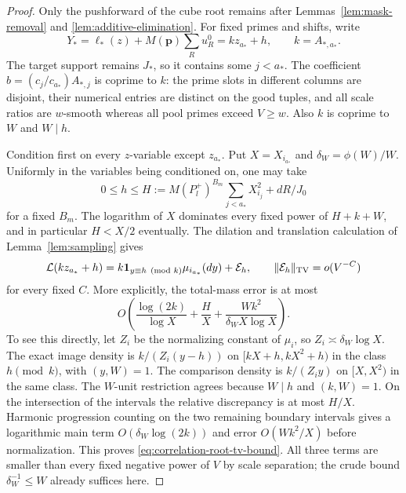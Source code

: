 \begin{proof}
Only the pushforward of the cube root remains after
Lemmas~\ref{lem:mask-removal} and \ref{lem:additive-elimination}.
For fixed primes and shifts, write
\begin{equation}
 Y_* = \ell_*(z)+M(\boldsymbol p)\sum_Ru_R^0
      = kz_{a_*}+h,
 \qquad k=A_{*,a_*}.
 \label{eq:correlation-root}
\end{equation}
The target support remains $J_*$, so it contains some $j<a_*$.
The coefficient
$b=(c_j/c_{a_*})A_{*,j}$ is coprime to $k$:
the prime slots in different columns are disjoint, their numerical
entries are distinct on the good tuples, and all scale ratios are
$w$-smooth whereas all pool primes exceed $V\ge w$.
Also $k$ is coprime to $W$ and $W\mid h$.

Condition first on every $z$-variable except $z_{a_*}$.  Put
$X=X_{i_{a_*}}$ and $\delta_W=\phi(W)/W$.  Uniformly in the variables
being conditioned on, one may take
\[
 0\le h\le H:=M(P_l^+)^{B_m}\sum_{j<a_*}X_{i_j}^2+dR/J_0
\]
for a fixed $B_m$.  The logarithm of $X$ dominates every fixed power
of $H+k+W$, and in particular $H<X/2$ eventually.
The dilation and translation calculation of Lemma~\ref{lem:sampling}
gives
\begin{equation}
 \mathcal L(kz_{a_*}+h)
   = k\mathbf 1_{y\equiv h\pmod{k}}\mu_{i_{a_*}}(dy)+\mathcal E_h,
 \qquad \|\mathcal E_h\|_{\mathrm{TV}}=o(V^{-C})
 \label{eq:correlation-root-progression}
\end{equation}
for every fixed $C$.  More explicitly, the total-mass error is at most
\begin{equation}
 O\left(\frac{\log(2k)}{\log X}+\frac H X+
                  \frac{Wk^2}{\delta_W X\log X}\right).
 \label{eq:correlation-root-tv-bound}
\end{equation}
To see this directly, let $Z_i$ be the normalizing constant of $\mu_i$,
so $Z_i\asymp\delta_W\log X$.  The exact image density is
$k/(Z_i(y-h))$ on $[kX+h,kX^2+h)$ in the class $h\pmod k$,
with $(y,W)=1$.  The comparison density is $k/(Z_i y)$ on
$[X,X^2)$ in the same class.  The $W$-unit restriction agrees because
$W\mid h$ and $(k,W)=1$.  On the intersection of the intervals the
relative discrepancy is at most $H/X$.  Harmonic progression counting
on the two remaining boundary intervals gives a logarithmic main
term $O(\delta_W\log(2k))$ and error $O(Wk^2/X)$ before normalization.
This proves \eqref{eq:correlation-root-tv-bound}.  All three terms
are smaller than every fixed negative power of $V$ by scale separation;
the crude bound $\delta_W^{-1}\le W$ already suffices here.


\end{proof}
